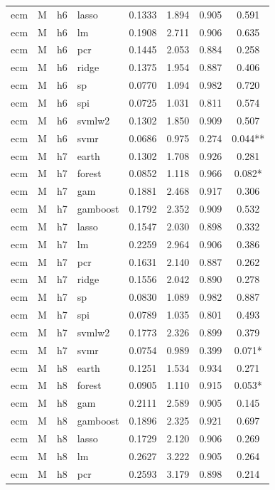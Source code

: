 \begin{ThreePartTable}
\begin{longtable}[t]{llclcccc}
ecm & M & h6 & lasso & 0.1333 & 1.894 & 0.905 & 0.591\\
ecm & M & h6 & lm & 0.1908 & 2.711 & 0.906 & 0.635\\
ecm & M & h6 & pcr & 0.1445 & 2.053 & 0.884 & 0.258\\
ecm & M & h6 & ridge & 0.1375 & 1.954 & 0.887 & 0.406\\
ecm & M & h6 & sp & 0.0770 & 1.094 & 0.982 & 0.720\\
ecm & M & h6 & spi & 0.0725 & 1.031 & 0.811 & 0.574\\
ecm & M & h6 & svmlw2 & 0.1302 & 1.850 & 0.909 & 0.507\\
ecm & M & h6 & svmr & 0.0686 & 0.975 & 0.274 & 0.044**\\
\addlinespace
ecm & M & h7 & earth & 0.1302 & 1.708 & 0.926 & 0.281\\
ecm & M & h7 & forest & 0.0852 & 1.118 & 0.966 & 0.082*\\
ecm & M & h7 & gam & 0.1881 & 2.468 & 0.917 & 0.306\\
ecm & M & h7 & gamboost & 0.1792 & 2.352 & 0.909 & 0.532\\
ecm & M & h7 & lasso & 0.1547 & 2.030 & 0.898 & 0.332\\
ecm & M & h7 & lm & 0.2259 & 2.964 & 0.906 & 0.386\\
ecm & M & h7 & pcr & 0.1631 & 2.140 & 0.887 & 0.262\\
ecm & M & h7 & ridge & 0.1556 & 2.042 & 0.890 & 0.278\\
ecm & M & h7 & sp & 0.0830 & 1.089 & 0.982 & 0.887\\
ecm & M & h7 & spi & 0.0789 & 1.035 & 0.801 & 0.493\\
ecm & M & h7 & svmlw2 & 0.1773 & 2.326 & 0.899 & 0.379\\
ecm & M & h7 & svmr & 0.0754 & 0.989 & 0.399 & 0.071*\\
\addlinespace
ecm & M & h8 & earth & 0.1251 & 1.534 & 0.934 & 0.271\\
ecm & M & h8 & forest & 0.0905 & 1.110 & 0.915 & 0.053*\\
ecm & M & h8 & gam & 0.2111 & 2.589 & 0.905 & 0.145\\
ecm & M & h8 & gamboost & 0.1896 & 2.325 & 0.921 & 0.697\\
ecm & M & h8 & lasso & 0.1729 & 2.120 & 0.906 & 0.269\\
ecm & M & h8 & lm & 0.2627 & 3.222 & 0.905 & 0.264\\
ecm & M & h8 & pcr & 0.2593 & 3.179 & 0.898 & 0.214\\

\end{longtable}
\end{ThreePartTable}
